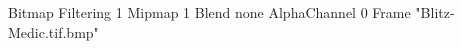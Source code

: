 {Bitmap
	{Filtering 1}
	{Mipmap 1}
	{Blend none}
	{AlphaChannel 0}
	{Frame "Blitz-Medic.tif.bmp"}
}
